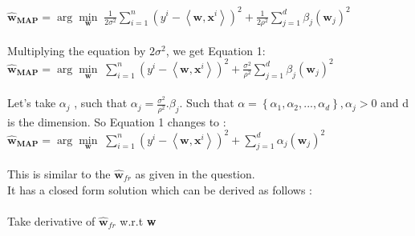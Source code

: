 \documentclass[a4paper,11pt]{article}
\begin{document}
\begin{mlsolution}
\begin{math}
\widehat{\textbf{w}}_{\textbf{MAP}}  = \arg \underset{\textbf{w}}{\min} \;
\frac{1}{2\sigma^{2}} \sum_{i = 1}^{n} \left ( y^{i} - \left \langle \textbf{w}, \textbf{x}^{i} \right \rangle \right )^{2} + \frac{1}{2\rho^{2}} \sum_{j = 1}^{d} \beta_{j}\left ( \textbf{w}_{j} \right )^{2}
\end{math}\\\\
Multiplying the equation by \begin{math}2\sigma^{2}\end{math}, we get Equation 1:\\

\begin{math}
\widehat{\textbf{w}}_{\textbf{MAP}}  = \arg \underset{\textbf{w}}{\min} \; \sum_{i = 1}^{n} \left ( y^{i} - \left \langle \textbf{w}, \textbf{x}^{i} \right \rangle \right )^{2} + \frac{\sigma^{2}}{\rho^{2}} \sum_{j = 1}^{d} \beta_{j}\left ( \textbf{w}_{j} \right )^{2}
\end{math}\\\\
Let's take \begin{math}\alpha_{j}\end{math} , such that \begin{math} \alpha_{j} = \frac{\sigma^{2}}{\rho^{2}}.\beta_{j}  \end{math}.
Such that \begin{math} \alpha = \left \{ \alpha_{1}, \alpha_{2}, ..., \alpha_{d} \right \} , \alpha_{j} > 0\end{math}  and d is the dimension.
So Equation 1 changes to :\\

\begin{math}
\widehat{\textbf{w}}_{\textbf{MAP}}  = \arg \underset{\textbf{w}}{\min} \; \sum_{i = 1}^{n} \left ( y^{i} - \left \langle \textbf{w}, \textbf{x}^{i} \right \rangle \right )^{2} + \sum_{j = 1}^{d} \alpha_{j}\left ( \textbf{w}_{j} \right )^{2}
\end{math}\\\\This is similar to the \begin{math}\widehat{\textbf{w}}_{fr}\end{math} as given in the question.\\It has a closed form solution which can be derived as follows : \\\\Take derivative of \begin{math}\widehat{\textbf{w}}_{fr}\end{math} w.r.t \textbf{w}\\\\


\end{mlsolution}
\end{document}
